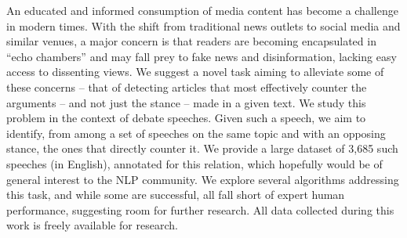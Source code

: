 An educated and informed consumption of media content has become a challenge in modern times. With the shift from traditional news outlets to social media and similar venues, a major concern is that readers are becoming encapsulated in ``echo chambers'' and may fall prey to fake news and disinformation, lacking easy access to dissenting views. We suggest a novel task aiming to alleviate some of these concerns -- that of detecting articles that most effectively counter the arguments -- and not just the stance -- made in a given text. We study this problem in the context of debate speeches. Given such a speech, we aim to identify, from among a set of speeches on the same topic and with an opposing stance, the ones that directly counter it. We provide a large dataset of 3,685 such speeches (in English), annotated for this relation, which hopefully would be of general interest to the NLP community. We explore several algorithms addressing this task, and while some are successful, all fall short of expert human performance, suggesting room for further research. All data collected during this work is freely available for research.
